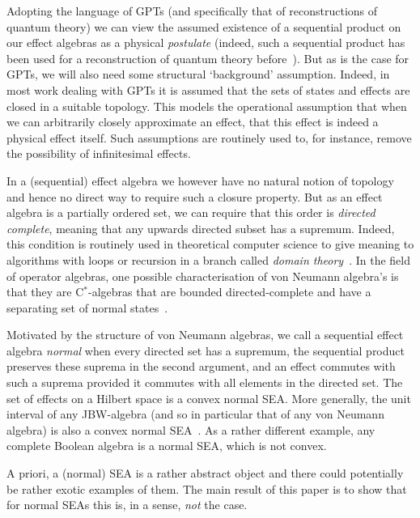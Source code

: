 \documentclass[a4paper, onecolumn, accepted=2020-12-22]{quantumarticle}
\theoremstyle{definition}
\begin{document}
Adopting the language of GPTs (and specifically that of reconstructions of quantum theory) we can view the assumed existence of a sequential product on our effect algebras as a physical \emph{postulate} (indeed, such a sequential product has been used for a reconstruction of quantum theory before~\cite{wetering2018sequential}). 
But as is the case for GPTs, we will also need some structural `background' assumption. 
Indeed, in most work dealing with GPTs it is assumed that the sets of states and effects are closed in a suitable topology. 
This models the operational assumption that when we can arbitrarily closely approximate an effect, that this effect is indeed a physical effect itself. Such assumptions are routinely used to, for instance, remove the possibility of infinitesimal effects.

In a (sequential) effect algebra we however have no natural notion of topology and hence no direct way to require such a closure property.
But as an effect algebra is a partially ordered set, we can require that this order is \emph{directed complete}, meaning that any upwards directed subset has a supremum. 
Indeed, this condition is routinely used in theoretical computer science
    to give meaning to algorithms with loops or recursion
    in a branch called \emph{domain theory}~\cite{abramsky1994domain}.
In the field of operator algebras, one possible characterisation
    of von Neumann algebra's is that they are
    C$^*$-algebras that are bounded directed-complete
    and have a separating set of normal states~\cite{kadison1956operator,bramthesis,rennela2014towards}.

Motivated by the structure of von Neumann algebras, we call a sequential effect algebra \emph{normal} when every directed set has a supremum,
    the sequential product preserves these suprema in the second argument,
        and an effect commutes with such a suprema provided
        it commutes with all elements in the directed set.
The set of effects on a Hilbert space is a convex normal SEA.
More generally, the unit interval
    of any JBW-algebra (and so in particular that of any von Neumann algebra)
    is also a convex normal SEA~\cite{wetering2019commutativity}.
As a rather different example,
    any complete Boolean algebra is a normal SEA,
    which is not convex.

A priori, a (normal) SEA is a rather abstract object and there could potentially be rather exotic examples of them. The main result of this paper is to show that for normal SEAs this is, in a sense, \emph{not} the case.
\end{document}
